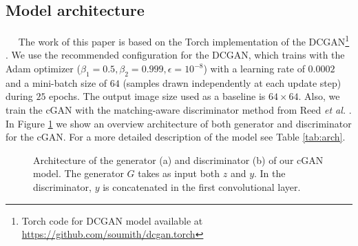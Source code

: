 \documentclass{article}
\newcommand{\minisection}[1]{\vspace{0.04in} \noindent {\bf #1}\ \ }
\begin{document}
\subsection{Model architecture} \label{icgan:arch}
\minisection{Conditional GAN}
The work of this paper is based on the Torch implementation of the DCGAN\footnote{Torch code for DCGAN model available at \url{https://github.com/soumith/dcgan.torch}} \cite{Radford2015}. We use the recommended configuration for the DCGAN, which trains with the Adam optimizer \citep{adam2014} ($\beta_1=0.5,\beta_2=0.999,\epsilon=10^{-8}$) with a learning rate of $0.0002$ and a mini-batch size of $64$ (samples drawn independently at each update step) during $25$ epochs. The output image size used as a baseline is $64\times64$. Also, we train the cGAN with the matching-aware discriminator method from Reed \textit{et al.} \cite{Reed2016}.
In Figure \ref{fig:cGAN_arch} we show an overview architecture of both generator and discriminator for the cGAN. For a more detailed description of the model see Table \ref{tab:arch}.

\begin{figure}[t]
        \centering
        \caption{Architecture of the generator (a) and discriminator (b) of our cGAN model. The generator $G$ takes as input both $z$ and $y$. In the discriminator, $y$ is concatenated in the first convolutional layer.}\label{fig:cGAN_arch}
\end{figure}
\end{document}
